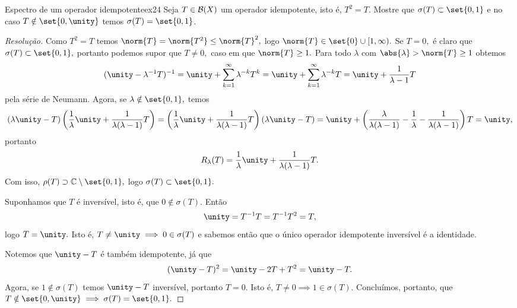 \begin{exercício}{Espectro de um operador idempotente}{ex24}
  Seja \(T \in \mathcal{B}(X)\) um operador idempotente, isto é, \(T^2 = T.\) Mostre que \(\sigma(T) \subset \set{0,1}\) e no caso \(T \notin \set{0,\unity}\) temos \(\sigma(T) = \set{0,1}\).
\end{exercício}
\begin{proof}[Resolução]
  Como \(T^2 = T\) temos \(\norm{T} = \norm{T^2} \leq \norm{T}^2,\) logo \(\norm{T} \in \set{0} \cup [1, \infty).\) Se \(T = 0,\) é claro que \(\sigma(T) \subset \set{0,1},\) portanto podemos supor que \(T \neq 0,\) caso em que \(\norm{T} \geq 1.\) Para todo \(\lambda\) com \(\abs{\lambda} > \norm{T} \geq 1\) obtemos
  \begin{equation*}
    (\unity - \lambda^{-1}T)^{-1} = \unity + \sum_{k = 1}^\infty \lambda^{-k}T^k = \unity + \sum_{k = 1}^\infty \lambda^{-k} T =  \unity + \frac{1}{\lambda - 1}T
  \end{equation*}
  pela série de Neumann. Agora, se \(\lambda \notin \set{0,1},\) temos
  \begin{equation*}
    (\lambda\unity - T)\left(\frac{1}{\lambda}\unity + \frac{1}{\lambda(\lambda - 1)}T\right) = \left(\frac{1}{\lambda}\unity + \frac{1}{\lambda(\lambda - 1)}T\right)(\lambda\unity - T) = \unity + \left(\frac{\lambda}{\lambda(\lambda - 1)} - \frac1\lambda - \frac1{\lambda(\lambda - 1)}\right)T = \unity,
  \end{equation*}
  portanto
  \begin{equation*}
    R_\lambda(T) = \frac{1}{\lambda}\unity + \frac{1}{\lambda(\lambda - 1)}T.
  \end{equation*}
  Com isso, \(\rho(T) \supset \mathbb{C} \setminus \set{0,1},\) logo \(\sigma(T) \subset \set{0,1}.\)

  Suponhamos que \(T\) é inversível, isto é, que \(0 \notin \sigma(T).\) Então
  \begin{equation*}
    \unity = T^{-1}T = T^{-1} T^2 = T,
  \end{equation*}
  logo \(T = \unity.\) Isto é, \(T \neq \unity \implies 0 \in \sigma(T)\) e sabemos então que o único operador idempotente inversível é a identidade.

  Notemos que \(\unity - T\) é também idempotente, já que
  \begin{equation*}
    (\unity - T)^2 = \unity - 2T + T^2 = \unity - T.
  \end{equation*}
  Agora, se \(1 \notin \sigma(T)\) temos \(\unity - T\) inversível, portanto \(T = 0.\) Isto é, \(T \neq 0 \implies 1 \in \sigma(T).\) Concluímos, portanto, que \(T \notin \set{0,\unity} \implies \sigma(T) = \set{0,1}.\)
\end{proof}
